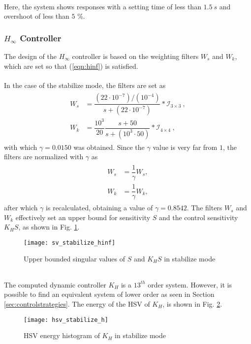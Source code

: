 \\Here, the system shows responses with a setting time of less than $1.5\ s$ and overshoot of less than $5$ \%.
\subsubsection{$H_\infty$ Controller}
The design of the $H_\infty$ controller is based on the weighting filters $W_s$ and $W_k$, which are set so that (\ref{eqn:hinf}) is satisfied.\\\\
In the case of the stabilize mode, the filters are set as 
\begin{align}
\begin{split}
W_{s} &= \dfrac{(22\cdot10^{-7})/(10^{-4})}{s + (22\cdot10^{-7})}*\mathcal{I}_{3\times 3}\ ,\\[5px]
W_{k} &= \dfrac{10^{3}}{20}\dfrac{s+50}{s+(10^{3}\cdot 50)}*\mathcal{I}_{4\times 4}\ ,
\end{split}
\end{align}
with which $\gamma = 0.0150$ was obtained. Since the $\gamma$ value is very far from $1$, the filters are normalized with $\gamma$ as
\begin{align}
\begin{split}
W_{s} &= \dfrac{1}{\gamma} W_{s},\\[5px]
W_{k} &= \dfrac{1}{\gamma} W_{k},
\end{split}
\end{align}
after which $\gamma$ is recalculated, obtaining a value of $\gamma = 0.8542 $. The filters $W_s$ and $W_k$  effectively set an upper bound for sensitivity $S$ and the control sensitivity $K_{H}S$, as shown in Fig. \ref{fig:sv_stabilize_hinf}.
\begin{figure}[h]
\begin{center}
\texttt{[image: sv\_stabilize\_hinf]}  
\caption{Upper bounded singular values of $S$ and $K_{H}S$ in stabilize mode} 
\label{fig:sv_stabilize_hinf}
\end{center}
\end{figure}
\\The computed dynamic controller $K_H$ is a $13^{th}$ order system. However, it is possible to find an equivalent system of lower order as seen in Section \ref{sec:controlstrategies}.
The energy of the HSV of $K_H$, is shown in Fig. \ref{fig:hsv_stabilize_h}.
\begin{figure}[h]
\begin{center}
\texttt{[image: hsv\_stabilize\_h]}  
\caption{HSV energy histogram of $K_H$ in stabilize mode} 
\label{fig:hsv_stabilize_h}
\end{center}
\end{figure}
